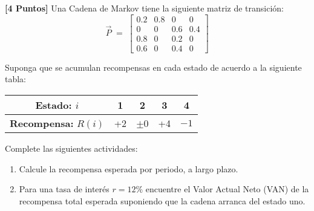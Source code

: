 \documentclass[ a4paper, twoside, 11pt]{article}
\begin{document}
\begin{problem}
\textbf{[4 Puntos]} Una Cadena de Markov tiene la siguiente matriz de transici\'on: 
\[
\vec{P} \; = \; \left[
\begin{array}{cccc}
0.2 & 0.8 & 0 & 0 \\
0 & 0 & 0.6 & 0.4 \\
0.8 & 0 & 0.2 & 0 \\
0.6 & 0 & 0.4 & 0
\end{array} \right]
\]

Suponga que se acumulan recompensas en cada estado de acuerdo a la siguiente tabla: 
\begin{table}[htb]
\centering
\begin{tabular}{|c|c|c|c|c|}
\hline
\textbf{Estado:} $i$ & 1 & 2 & 3 & 4 \\ \hline
\textbf{Recompensa:} $R(i)$ & +2 & $\pm$0 & +4 & $-1$ \\ \hline
\end{tabular}
\end{table}

Complete las siguientes actividades: 
\begin{enumerate}[label=\textbf{\alph*)}]
\item Calcule la recompensa esperada por periodo, a largo plazo. 
\item Para una tasa de inter\'es $r = 12\%$ encuentre el Valor Actual Neto (VAN) de la recompensa total esperada suponiendo que la cadena arranca del estado uno. 
\end{enumerate}
\QED

%

\end{problem}
\fullskip
\end{document}
